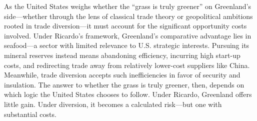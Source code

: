 \documentclass{adonis}
\begin{document}
    As the United States weighs whether the “grass is truly greener” on Greenland’s side—whether through the lens of classical trade theory or geopolitical ambitions rooted in trade diversion—it must account for the significant opportunity costs involved. Under Ricardo’s framework, Greenland’s comparative advantage lies in seafood—a sector with limited relevance to U.S. strategic interests. Pursuing its mineral reserves instead means abandoning efficiency, incurring high start-up costs, and redirecting trade away from relatively lower-cost suppliers like China. Meanwhile, trade diversion accepts such inefficiencies in favor of security and insulation. The answer to whether the grass is truly greener, then, depends on which logic the United States chooses to follow. Under Ricardo, Greenland offers little gain. Under diversion, it becomes a calculated risk—but one with substantial costs.
    
\printbibliography
	
\end{document}
